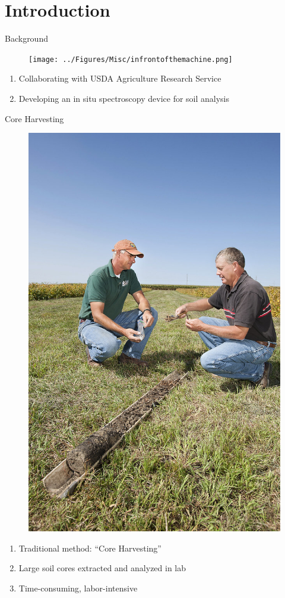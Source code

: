 \documentclass[10pt,hyperref={colorlinks,citecolor=blue,urlcolor=peking_blue,linkcolor=}]{beamer}
\theoremstyle{plain}
\begin{document}
\section{Introduction}
\begin{frame}{Background}
\begin{figure}[Visit to Auburn Lab in Alabama]
\begin{center}
\texttt{[image: ../Figures/Misc/infrontofthemachine.png]}
\end{center}
\end{figure}
\begin{enumerate}
\item Collaborating with USDA Agriculture Research Service
\item Developing an in situ spectroscopy device for soil analysis
\end{enumerate}
\end{frame}
\begin{frame}{Core Harvesting}
\begin{figure}[Core Harvest]
\begin{center}
\includegraphics[width=.2\linewidth]{../Figures/Misc/SoilCore.jpg}
\end{center}
\end{figure}
\begin{enumerate}
\item Traditional method: “Core Harvesting”
\item Large soil cores extracted and analyzed in lab
\item Time-consuming, labor-intensive
\end{enumerate}
\end{frame}
\end{document}
